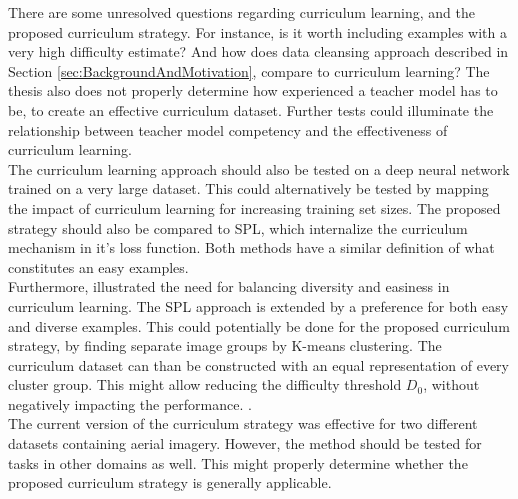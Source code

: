 There are some unresolved questions regarding curriculum learning, and the proposed curriculum strategy. For instance, is it worth including examples with a very high difficulty estimate? And how does data cleansing approach described in Section \ref{sec:BackgroundAndMotivation}, compare to curriculum learning? The thesis also does not properly determine how experienced a teacher model has to be, to create an effective curriculum dataset. Further tests could illuminate the relationship between teacher model competency and the effectiveness of curriculum learning.  \\

The curriculum learning approach should also be tested on a deep neural network trained on a very large dataset. This could alternatively be tested by mapping the impact of curriculum learning for increasing training set sizes. The proposed strategy should also be compared to \ac{SPL}\citep{Kumar_self_paced_learning}, which internalize the curriculum mechanism in it's loss function. Both methods have a similar definition of what constitutes an easy examples.\\

Furthermore, \cite{Lu_self-paced_learning_diversity} illustrated the need for balancing diversity and easiness in curriculum learning. The \ac{SPL} approach is extended by a preference for both easy and diverse examples. This could potentially be done for the proposed curriculum strategy, by finding separate image groups by K-means clustering. The curriculum dataset can than be constructed with an equal representation of every cluster group. This might allow reducing the difficulty threshold $D_0$, without negatively impacting the performance. .\\

The current version of the curriculum strategy was effective for two different datasets containing aerial imagery. However, the method should be tested for tasks in other domains as well. This might properly determine whether the proposed curriculum strategy is generally applicable.\\
 

